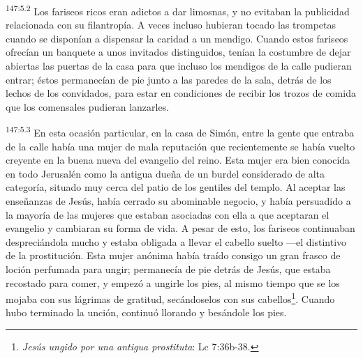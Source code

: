 \par 
\textsuperscript{147:5.2} Los fariseos ricos eran adictos a dar limosnas, y no evitaban la publicidad relacionada con su filantropía. A veces incluso hubieran tocado las trompetas cuando se disponían a dispensar la caridad a un mendigo. Cuando estos fariseos ofrecían un banquete a unos invitados distinguidos, tenían la costumbre de dejar abiertas las puertas de la casa para que incluso los mendigos de la calle pudieran entrar; éstos permanecían de pie junto a las paredes de la sala, detrás de los lechos de los convidados, para estar en condiciones de recibir los trozos de comida que los comensales pudieran lanzarles.

\par 
\textsuperscript{147:5.3} En esta ocasión particular, en la casa de Simón, entre la gente que entraba de la calle había una mujer de mala reputación que recientemente se había vuelto creyente en la buena nueva del evangelio del reino. Esta mujer era bien conocida en todo Jerusalén como la antigua dueña de un burdel considerado de alta categoría, situado muy cerca del patio de los gentiles del templo. Al aceptar las enseñanzas de Jesús, había cerrado su abominable negocio, y había persuadido a la mayoría de las mujeres que estaban asociadas con ella a que aceptaran el evangelio y cambiaran su forma de vida. A pesar de esto, los fariseos continuaban despreciándola mucho y estaba obligada a llevar el cabello suelto ---el distintivo de la prostitución. Esta mujer anónima había traído consigo un gran frasco de loción perfumada para ungir; permanecía de pie detrás de Jesús, que estaba recostado para comer, y empezó a ungirle los pies, al mismo tiempo que se los mojaba con sus lágrimas de gratitud, secándoselos con sus cabellos\footnote{\textit{Jesús ungido por una antigua prostituta}: Lc 7:36b-38.}. Cuando hubo terminado la unción, continuó llorando y besándole los pies.

